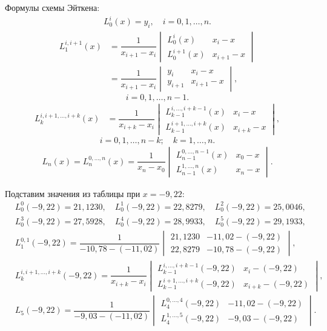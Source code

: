 \documentclass[14pt,a4paper]{extarticle}
\begin{document}
	\noindent Формулы схемы Эйткена:
	\begingroup\small
	\begin{gather*}
		L_0^i(x)=y_i,\quad i=0,1,\ldots,n.
	\end{gather*}
	\begin{align*}
		L_1^{i,i+1}(x)
		&=\dfrac{1}{x_{i+1}-x_i}
		\begin{vmatrix}
			L_0^i(x) & x_i-x\\
			L_0^{i+1}(x) & x_{i+1}-x
		\end{vmatrix}\\
		&=\dfrac{1}{x_{i+1}-x_i}
		\begin{vmatrix}
			y_i & x_i-x\\
			y_{i+1} & x_{i+1}-x
		\end{vmatrix},
	\end{align*}
	\[
		i=0,1,\ldots,n-1.
	\]
	\begin{align*}
		L_k^{i,i+1,\ldots,i+k}(x)
		&=\dfrac{1}{x_{i+k}-x_i}
		\begin{vmatrix}
			L_{k-1}^{i,\ldots,i+k-1}(x) & x_i-x\\
			L_{k-1}^{i+1,\ldots,i+k}(x) & x_{i+k}-x
		\end{vmatrix},
	\end{align*}
	\[
		i=0,1,\ldots,n-k;\quad k=1,\ldots,n.
	\]
	\begin{gather*}
		L_n(x)=L_n^{0,\ldots,n}(x)=\dfrac{1}{x_n-x_0}
		\begin{vmatrix}
			L_{n-1}^{0,\ldots,n-1}(x) & x_0-x\\
			L_{n-1}^{1,\ldots,n}(x) & x_n-x
		\end{vmatrix}.
	\end{gather*}
	\endgroup
	
	\noindent Подставим значения из таблицы при $x=-9{,}22$:
	\begingroup\small
	\begin{align*}
		&L_0^0(-9{,}22)=21{,}1230,\quad
		L_0^1(-9{,}22)=22{,}8279,\quad
		L_0^2(-9{,}22)=25{,}0046,\\
		&L_0^3(-9{,}22)=27{,}5928,\quad
		L_0^4(-9{,}22)=28{,}9933,\quad
		L_0^5(-9{,}22)=29{,}1933,\\
		&L_1^{0,1}(-9{,}22)=
		\dfrac{1}{-10{,}78-(-11{,}02)}
		\begin{vmatrix}
			21{,}1230 & -11{,}02-(-9{,}22)\\
			22{,}8279 & -10{,}78-(-9{,}22)
		\end{vmatrix},\\
		&L_k^{i,i+1,\ldots,i+k}(-9{,}22)=
		\dfrac{1}{x_{i+k}-x_i}
		\begin{vmatrix}
			L_{k-1}^{i,\ldots,i+k-1}(-9{,}22) & x_i-(-9{,}22)\\
			L_{k-1}^{i+1,\ldots,i+k}(-9{,}22) & x_{i+k}-(-9{,}22)
		\end{vmatrix},\\
		&L_5(-9{,}22)=
		\dfrac{1}{-9{,}03-(-11{,}02)}
		\begin{vmatrix}
			L_4^{0,\ldots,4}(-9{,}22) & -11{,}02-(-9{,}22)\\
			L_4^{1,\ldots,5}(-9{,}22) & -9{,}03-(-9{,}22)
		\end{vmatrix}.
	\end{align*}
	\endgroup
	
\end{document}
